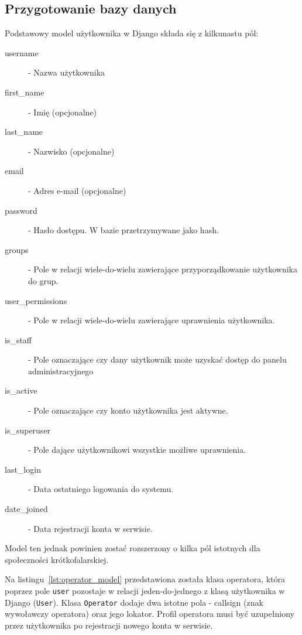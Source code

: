 \documentclass[]{mgr}
\begin{document}
            \subsection{Przygotowanie bazy danych}
            Podstawowy model użytkownika w Django składa się z kilkunastu pól:
            \begin{description}
                \item[username] - Nazwa użytkownika
                \item[first\_name] - Imię (opcjonalne)
                \item[last\_name] - Nazwisko (opcjonalne)
                \item[email] - Adres e-mail (opcjonalne)
                \item[password] - Hasło dostępu. W bazie przetrzymywane jako hash.
                \item[groups] - Pole w relacji wiele-do-wielu zawierające przyporządkowanie użytkownika do grup.
                \item[user\_permissions] - Pole w relacji wiele-do-wielu zawierające uprawnienia użytkownika.
                \item[is\_staff] - Pole oznaczające czy dany użytkownik może uzyskać dostęp do panelu administracyjnego
                \item[is\_active] - Pole oznaczające czy konto użytkownika jest aktywne.
                \item[is\_superuser] - Pole dające użytkownikowi wszystkie możliwe uprawnienia.
                \item[last\_login] - Data ostatniego logowania do systemu.
                \item[date\_joined] - Data rejestracji konta w serwisie.
            \end{description}
            Model ten jednak powinien zostać rozszerzony o kilka pól istotnych dla społeczności krótkofalarskiej.

            Na listingu~\ref{lst:operator_model} przedstawiona została klasa operatora, która poprzez pole \texttt{user} pozostaje w relacji jeden-do-jednego z klasą użytkownika w Django (\texttt{User}). Klasa \texttt{Operator} dodaje dwa istotne pola - callsign (znak wywoławczy operatora) oraz jego lokator. Profil operatora musi być uzupełniony przez użytkownika po rejestracji nowego konta w serwisie.

            
\end{document}
